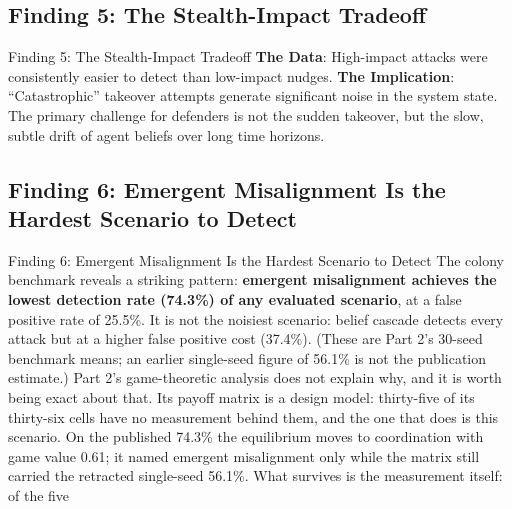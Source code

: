 \documentclass[
  ignorenonframetext,
]{beamer}
\begin{document}
\subsection{Finding 5: The Stealth-Impact
Tradeoff}\label{finding-5-the-stealth-impact-tradeoff}

\begin{frame}[allowframebreaks]{Finding 5: The Stealth-Impact Tradeoff}
\textbf{The Data}: High-impact attacks were consistently easier to
detect than low-impact nudges. \textbf{The Implication}:
``Catastrophic'' takeover attempts generate significant noise in the
system state. The primary challenge for defenders is not the sudden
takeover, but the slow, subtle drift of agent beliefs over long time
horizons.
\end{frame}

\subsection{Finding 6: Emergent Misalignment Is the Hardest Scenario to
Detect}\label{finding-6-emergent-misalignment-is-the-hardest-scenario-to-detect}

\begin{frame}[allowframebreaks]{Finding 6: Emergent Misalignment Is the
Hardest Scenario to Detect}
The colony benchmark reveals a striking pattern: \textbf{emergent
misalignment achieves the lowest detection rate (74.3\%) of any
evaluated scenario}, at a false positive rate of 25.5\%. It is not the
noisiest scenario: belief cascade detects every attack but at a higher
false positive cost (37.4\%). (These are Part 2's 30-seed benchmark
means; an earlier single-seed figure of 56.1\% is not the publication
estimate.) Part 2's game-theoretic analysis does not explain why, and it
is worth being exact about that. Its payoff matrix is a design model:
thirty-five of its thirty-six cells have no measurement behind them, and
the one that does is this scenario. On the published 74.3\% the
equilibrium moves to coordination with game value 0.61; it named
emergent misalignment only while the matrix still carried the retracted
single-seed 56.1\%. What survives is the measurement itself: of the five
\end{frame}
\end{document}
